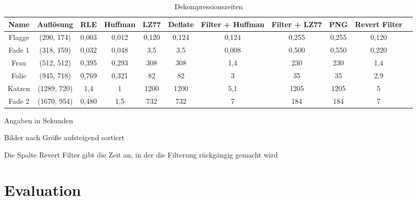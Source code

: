 \documentclass[conference]{IEEEtran}
\begin{document}
\begin{table}
  \renewcommand*{\arraystretch}{1.1}
  \centering
  \begin{threeparttable}
    \caption{Dekompressionszeiten}
    \begin{tabular}{c *9{c} S[table-format=5.9]}
      \toprule
      Name   & Auflösung   & RLE   & Huffman & LZ77  & Deflate & Filter + Huffman & Filter + LZ77 & PNG   & Revert Filter \\
      \midrule
      Flagge & (290, 174)  & 0,003 & 0,012   & 0,120 & 0,124   & 0,124            & 0,255         & 0,255 & 0,120         \\
      Fade 1 & (318, 159)  & 0,032 & 0,048   & 3,5   & 3,5     & 0,008            & 0,500         & 0,550 & 0,220         \\
      Frau   & (512, 512)  & 0,395 & 0,293   & 308   & 308     & 1,4              & 230           & 230   & 1,4           \\
      Folie  & (945, 718)  & 0,769 & 0,321   & 82    & 82      & 3                & 35            & 35    & 2,9           \\
      Katzen & (1289, 720) & 1,4   & 1       & 1200  & 1200    & 5,1              & 1205          & 1205  & 5             \\
      Fade 2 & (1670, 954) & 0,480 & 1,5     & 732   & 732     & 7                & 184           & 184   & 7
    \end{tabular}
    \par{} Angaben in Sekunden
    \par{} Bilder nach Größe aufsteigend sortiert
    \par{} Die Spalte Revert Filter gibt die Zeit an, in der die Filterung rückgängig gemacht wird
    \label{tab:dekompzeiten}
  \end{threeparttable}

\end{table}





\section{Evaluation}




\end{document}
